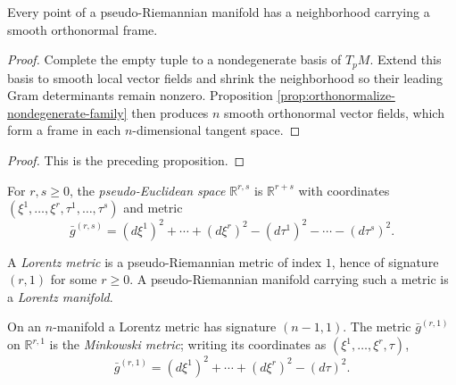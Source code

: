\begin{proposition}
\label{prop:orthonormal-frames-pseudo-riemannian}
\leanok
{}
Every point of a pseudo-Riemannian manifold has a neighborhood carrying a smooth
orthonormal frame.
\end{proposition}

\begin{proof}
\leanok
{}
\sketch Complete the empty tuple to a nondegenerate basis of $T_pM$. Extend this
basis to smooth local vector fields and shrink the neighborhood so their leading
Gram determinants remain nonzero. Proposition
\ref{prop:orthonormalize-nondegenerate-family} then produces $n$ smooth
orthonormal vector fields, which form a frame in each $n$-dimensional tangent
space.
\end{proof}

\begin{proof}
\leanok
{}
\sketch This is the preceding proposition.
\end{proof}

For $r,s\geq0$, the \emph{pseudo-Euclidean space} $\mathbb R^{r,s}$ is
$\mathbb R^{r+s}$ with coordinates
$(\xi^1,\ldots,\xi^r,\tau^1,\ldots,\tau^s)$ and metric
\begin{equation}
\bar g^{(r,s)}=(d\xi^1)^2+\cdots+(d\xi^r)^2
 -(d\tau^1)^2-\cdots-(d\tau^s)^2. \tag{2.24}
\end{equation}

\begin{definition}
\label{def:lorentz-metric}
\leanok
{}
A \emph{Lorentz metric} is a pseudo-Riemannian metric of index $1$, hence of
signature $(r,1)$ for some $r\geq0$. A pseudo-Riemannian manifold carrying such a
metric is a \emph{Lorentz manifold}.
\end{definition}

On an $n$-manifold a Lorentz metric has signature $(n-1,1)$. The metric
$\bar g^{(r,1)}$ on $\mathbb R^{r,1}$ is the \emph{Minkowski metric}; writing its
coordinates as $(\xi^1,\ldots,\xi^r,\tau)$,
\begin{equation}
\bar g^{(r,1)}=(d\xi^1)^2+\cdots+(d\xi^r)^2-(d\tau)^2. \tag{2.25}
\end{equation}

